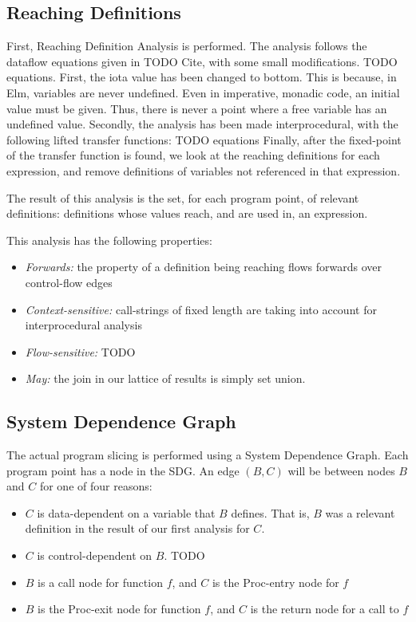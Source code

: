 \documentclass{article}
\begin{document}
\subsection{Reaching Definitions}

First, Reaching Definition Analysis is performed. The analysis follows the dataflow equations given in TODO Cite, with some small modifications. TODO equations. First, the iota value has been changed to bottom. This is because, in Elm, variables are never undefined. Even in imperative, monadic code, an initial value must be given. Thus, there is never a point where a free variable has an undefined value. Secondly, the analysis has been made interprocedural, with the following lifted transfer functions: TODO equations Finally, after the fixed-point of the transfer function is found, we look at the reaching definitions for each expression, and remove definitions of variables not referenced in that expression.

The result of this analysis is the set, for each program point, of relevant definitions: definitions whose values reach, and are used in, an expression.

This analysis has the following properties:

\begin{itemize}
\item
 \textit{Forwards:} the property of a definition being reaching flows forwards over control-flow edges 
\item
 \textit{Context-sensitive:} call-strings of fixed length are taking into account for interprocedural analysis 
\item
 \textit{Flow-sensitive:} TODO 
\item
 \textit{May:} the join in our lattice of results is simply set union.

\end{itemize}

\subsection{System Dependence Graph}

The actual program slicing is performed using a System Dependence Graph. Each program point has a node in the SDG. An edge $(B,C)$ will be between nodes $B$ and $C$ for one of four reasons:
\begin{itemize}
\item $C$ is data-dependent on a variable that $B$ defines. That is, $B$ was a relevant definition in the result of our first analysis for $C$. 
\item $C$ is control-dependent on $B$. TODO
\item $B$ is a call node for function $f$, and $C$ is the Proc-entry node for $f$ 
\item $B$ is the Proc-exit node for function $f$, and $C$ is the return node for a call to $f$
\end{itemize} 
\end{document}
